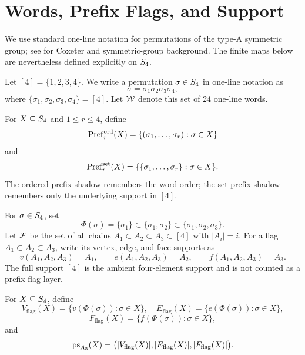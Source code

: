 \section{Words, Prefix Flags, and Support}
\label{sec:s4-indexing}

We use standard one-line notation for permutations of the type-A symmetric group; see \cite{BjornerBrenti2005} for Coxeter and symmetric-group background. The finite maps below are nevertheless defined explicitly on \(S_4\).

\begin{definition}
\label{def:one-line-s4}
Let \([4]=\{1,2,3,4\}\). We write a permutation \(\sigma\in S_4\) in one-line notation as
\[
  \sigma=\sigma_1\sigma_2\sigma_3\sigma_4,
\]
where \(\{\sigma_1,\sigma_2,\sigma_3,\sigma_4\}=[4]\). Let \(\mathcal W\) denote this set of 24 one-line words.
\end{definition}

\begin{definition}
\label{def:prefix-shadows}
For \(X\subseteq S_4\) and \(1\le r\le4\), define
\[
  \operatorname{Pref}_r^{\mathrm{ord}}(X)=\{(\sigma_1,\ldots,\sigma_r):\sigma\in X\}
\]
and
\[
  \operatorname{Pref}_r^{\mathrm{set}}(X)=\{\{\sigma_1,\ldots,\sigma_r\}:\sigma\in X\}.
\]
The ordered prefix shadow remembers the word order; the set-prefix shadow remembers only the underlying support in \([4]\).
\end{definition}

\begin{definition}
\label{def:prefix-flag}
For \(\sigma\in S_4\), set
\[
  \Phi(\sigma)=\{\sigma_1\}\subset \{\sigma_1,\sigma_2\}\subset \{\sigma_1,\sigma_2,\sigma_3\}.
\]
Let \(\mathcal F\) be the set of all chains \(A_1\subset A_2\subset A_3\subset [4]\) with \(|A_i|=i\). For a flag \(A_1\subset A_2\subset A_3\), write its vertex, edge, and face supports as
\[
  v(A_1,A_2,A_3)=A_1,\qquad e(A_1,A_2,A_3)=A_2,
  \qquad f(A_1,A_2,A_3)=A_3.
\]
The full support \([4]\) is the ambient four-element support and is not counted as a prefix-flag layer.
\end{definition}

\begin{definition}
\label{def:prefix-support-vector}
For \(X\subseteq S_4\), define
\[
  V_{\mathrm{flag}}(X)=\{v(\Phi(\sigma)):\sigma\in X\},\quad
  E_{\mathrm{flag}}(X)=\{e(\Phi(\sigma)):\sigma\in X\},
\]
\[
  F_{\mathrm{flag}}(X)=\{f(\Phi(\sigma)):\sigma\in X\},
\]
and
\[
  \operatorname{ps}_{A_3}(X)=\bigl(|V_{\mathrm{flag}}(X)|,|E_{\mathrm{flag}}(X)|,|F_{\mathrm{flag}}(X)|\bigr).
\]
\end{definition}

